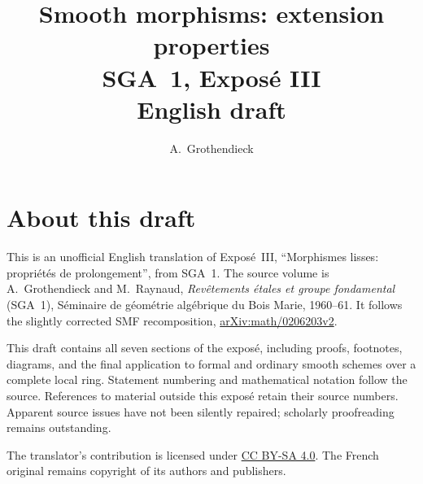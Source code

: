 \documentclass[11pt,a4paper,oneside]{amsbook}
\title[SGA~1, Expos\'e III (English draft)]{Smooth morphisms: extension properties\\
{\normalsize SGA~1, Expos\'e III\\English draft}}
\author{A.\ Grothendieck}
\date{}
\numberwithin{equation}{section}
\theoremstyle{plain}
\theoremstyle{definition}
\theoremstyle{remark}
\begin{document}
\frontmatter
\maketitle

\chapter*{About this draft}
This is an unofficial English translation of Expos\'e~III,
``Morphismes lisses: propri\'et\'es de prolongement'', from SGA~1.
The source volume is A.~Grothendieck and M.~Raynaud,
\textit{Rev\^etements \'etales et groupe fondamental} (SGA~1),
S\'eminaire de g\'eom\'etrie alg\'ebrique du Bois Marie, 1960--61.
It follows the slightly corrected SMF recomposition,
\href{https://arxiv.org/abs/math/0206203v2}{arXiv:math/0206203v2}.

This draft contains all seven sections of the expos\'e, including proofs,
footnotes, diagrams, and the final application to formal and ordinary
smooth schemes over a complete local ring. Statement numbering and
mathematical notation follow the source. References to material outside
this expos\'e retain their source numbers. Apparent source issues have not
been silently repaired; scholarly proofreading remains outstanding.

The translator's contribution is licensed under
\href{https://creativecommons.org/licenses/by-sa/4.0/}{CC BY-SA 4.0}.
The French original remains copyright of its authors and publishers.

\tableofcontents
\mainmatter







\end{document}
